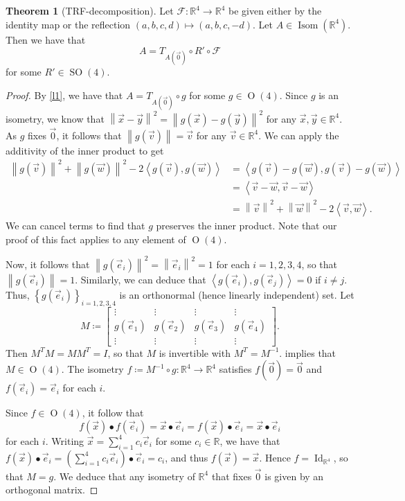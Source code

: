 \documentclass[10pt,letterpaper,cm]{nupset}
\theoremstyle{definition}
\theoremstyle{theorem}
\newtheorem{theorem}[definition]{Theorem}
\theoremstyle{remark}
\newcommand{\F}{\mathcal F}
\newcommand{\R}{\mathbb R}
\newcommand{\1}{\mathbf{1}}
\newcommand{\e}{\vec e}
\newcommand{\g}{\vec g}
\renewcommand{\v}{\vec v}
\newcommand{\w}{\vec w}
\newcommand{\x}{\vec x}
\newcommand{\y}{\vec y}
\newcommand{\0}{\vec {0}}
\DeclareMathOperator{\ORT}{O}
\DeclareMathOperator{\Id}{Id}
\DeclareMathOperator{\Isom}{Isom}
\DeclareMathOperator{\SO}{SO}
\begin{document}
\begin{theorem}[TRF-decomposition]\label{t1}
Let $\F:\R^4\to \R^4$ be given either by the identity map or the reflection $\left(a,b,c,d\right)\mapsto \left(a,b,c,{-d}\right)$. Let $A\in \Isom(\R^4)$. Then we have that $$A=T_{A(\0)}\circ R' \circ  \F$$ for some $R'\in \SO(4)$.
\end{theorem}
\begin{proof}
 By \cref{l1}, we have that $A=T_{A(\0)}\circ g$ for some $g\in \ORT(4)$. Since $g$ is an isometry, we know that $ \left\lVert{\x-\y}\right\rVert^2= \left\lVert{g(\x)-g(\y)}\right\rVert^2$ for any $\x, \y\in \R^4$. As $g$ fixes $\0$, it follows that $ \left\lVert{g(\v)}\right\rVert=\v$ for any $\v\in \R^4$.
We can apply the additivity of the inner product to get  
\begin{align*}
 \left\lVert{g(\v)}\right\rVert^2+ \left\lVert{g(\w)}\right\rVert^2-2\left\langle g(\v), g(\w)\right\rangle & =\left\langle g(\v)-g(\w), g(\v)-g(\w)\right\rangle 
\\ & =\left\langle \v-\w, \v-\w\right\rangle
\\ & = \left\lVert{\v}\right\rVert^2+ \left\lVert{\w}\right\rVert^2-2\left\langle \v, \w\right\rangle.
\end{align*}  We can cancel terms to find that $g$ preserves the inner product. Note that our proof of this fact applies to any element of $\ORT(4)$.

Now, it follows that $ \left\lVert{g(\e_i)}\right\rVert^2= \left\lVert{\e_i}\right\rVert^2=1$ for each $i=1,2,3,4$, so that $ \left\lVert{g(\e_i)}\right\rVert=1$. Similarly,  we can deduce that  $\left\langle g(\e_i),g(\e_j)\right\rangle = 0$ if $i\ne j$. Thus, $\left\{g(\e_i)\right\}_{i=1,2,3,4}$ is an orthonormal (hence linearly independent) set.  Let $$M\coloneqq \begin{bmatrix} \vdots & \vdots & \vdots & \vdots \\g(\e_1) & g(\e_2) & g(\e_3) & g(\e_4) \\ \vdots & \vdots & \vdots & \vdots\end{bmatrix}.$$ Then $M^TM=MM^T=I$, so that $M$ is invertible with $M^T=M^{-1}$.   implies that $M\in \ORT(4)$. The isometry $f\coloneqq M^{-1}\circ g:\R^4 \to \R^4$ satisfies $f(\0)=\0$ and $f(\e_i)=\e_i$ for each $i$. 

Since $f\in \ORT(4)$, it follow that $$f(\x)\bullet f(\e_i) = \x \bullet \e_i=f(\x)\bullet \e_i=\x\bullet \e_i$$ for each $i$. Writing $\x=\sum_{i=1}^4 c_i\e_i$ for some $c_i\in \R$, we have that $f(\x)\bullet \e_i =\left(\sum_{i=1}^4 c_i\e_i\right) \bullet \e_i=c_i$, and thus $f(\x)=\x$. Hence $f=\Id_{\R^4}$, so that $M=g$.  We deduce that any isometry of $\R^4$ that fixes $\0$ is given by an orthogonal matrix.


\end{proof}
\end{document}
